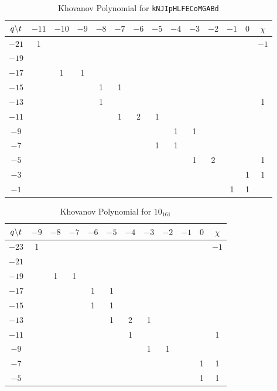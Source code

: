 \begin{table}
    \centering
    \begin{tabular}{| c | c | c | c | c | c | c | c | c | c | c | c | c | c |}
        \hline
        $q\symbol{92}t$&$-11$&$-10$&$-9$&$-8$&$-7$&$-6$&$-5$&$-4$&$-3$&$-2$&$-1$&$0$&$\chi$\\
        \hline
        $-21$&1&&&&&&&&&&&&$-1$\\
        \hline
        $-19$&&&&&&&&&&&&&\\
        \hline
        $-17$&&1&1&&&&&&&&&&\\
        \hline
        $-15$&&&&1&1&&&&&&&&\\
        \hline
        $-13$&&&&1&&&&&&&&&1\\
        \hline
        $-11$&&&&&1&2&1&&&&&&\\
        \hline
        $-9$&&&&&&&&1&1&&&&\\
        \hline
        $-7$&&&&&&&1&1&&&&&\\
        \hline
        $-5$&&&&&&&&&1&2&&&1\\
        \hline
        $-3$&&&&&&&&&&&&1&1\\
        \hline
        $-1$&&&&&&&&&&&1&1&\\
        \hline
    \end{tabular}
    \caption{Khovanov Polynomial for \texttt{kNJIpHLFECoMGABd}}
\end{table}
\begin{table}
    \centering
    \begin{tabular}{| c | c | c | c | c | c | c | c | c | c | c | c |}
        \hline
        $q\symbol{92}t$&$-9$&$-8$&$-7$&$-6$&$-5$&$-4$&$-3$&$-2$&$-1$&$0$&$\chi$\\
        \hline
        $-23$&1&&&&&&&&&&$-1$\\
        \hline
        $-21$&&&&&&&&&&&\\
        \hline
        $-19$&&1&1&&&&&&&&\\
        \hline
        $-17$&&&&1&1&&&&&&\\
        \hline
        $-15$&&&&1&1&&&&&&\\
        \hline
        $-13$&&&&&1&2&1&&&&\\
        \hline
        $-11$&&&&&&1&&&&&1\\
        \hline
        $-9$&&&&&&&1&1&&&\\
        \hline
        $-7$&&&&&&&&&&1&1\\
        \hline
        $-5$&&&&&&&&&&1&1\\
        \hline
    \end{tabular}
    \caption{Khovanov Polynomial for $10_{161}$}
\end{table}
